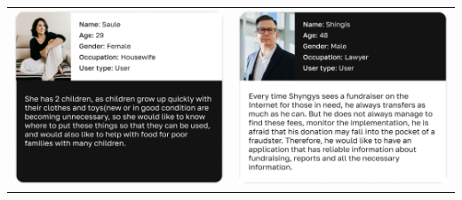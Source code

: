 \begin{center}
\begin{tabular}{ c  c }
\begin{minipage}{0.2\textwidth}
                \includegraphics[scale=0.2]{figures/userPersonas/User-persona 03.jpg}
            \end{minipage} \hspace*{0.5cm} & \begin{minipage}{0.2\textwidth}
                    \includegraphics[scale=0.2]{figures/userPersonas/User-persona 04.jpg}
                \end{minipage}  \\
        \end{tabular}
    \end{center}
    
